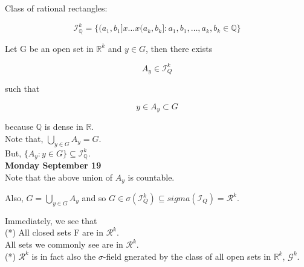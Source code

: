 \documentclass[11pt,fleqn]{book} %
\begin{document}
Class of rational rectangles: 

$$ \mathcal{I}^k_\mathbb{Q} = \{(a_1, b_1]x \dots x(a_k, b_k]: a_1, b_1, \dots, a_k, b_k \in \mathbb{Q} \}$$

Let G be an open set in $\mathbb{R}^k$ and $y \in G$, then there exists
 
$$ A_y \in  \mathcal{I}^k_Q $$

such that

$$y \in A_y \subset G $$

because $\mathbb{Q}$ is dense in $\mathbb{R}$.\\

Note that, $\bigcup_{y\in G} A_y = G$. \\

But, $\{A_y: y \in G \} \subseteq \mathcal{I}^k_\mathbb{Q}$.\\


\textbf{Monday September 19}\\

Note that the above union of $A_y$ is countable. 

Also,  $G = \bigcup_{y \in G} A_y$ and so $G \in \sigma(\mathcal{I}^k_Q) \subseteq sigma(\mathcal{I}_Q) = \mathcal{R}^k$.

Immediately, we see that\\

(*) All closed sets F are in $\mathcal{R}^k$.\\

All sets we commonly see are in $\mathcal{R}^k$.\\

(*) $\mathcal{R}^k$ is in fact also the $\sigma$-field gnerated by the class of all open sets in $\mathbb{R}^k$, $\mathcal{G}^k$.
\end{document}
